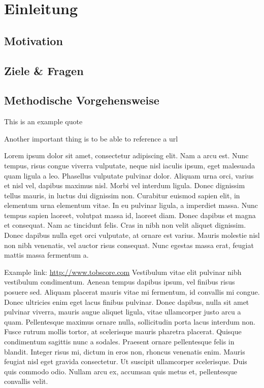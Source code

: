 \chapter{Einleitung}\label{chap:intro}
\section{Motivation}
\section{Ziele \& Fragen}
\section{Methodische Vorgehensweise}
This is an example quote \cite{TKerst12}

Another important thing is to be able to reference a url \cite{referenceURL}

Lorem ipsum dolor sit amet, consectetur adipiscing elit. Nam a arcu est. Nunc tempus, risus congue viverra vulputate, neque nisl iaculis ipsum, eget malesuada quam ligula a leo. Phasellus vulputate pulvinar dolor. Aliquam urna orci, varius et nisl vel, dapibus maximus nisl. Morbi vel interdum ligula. Donec dignissim tellus mauris, in luctus dui dignissim non. Curabitur euismod sapien elit, in elementum urna elementum vitae. In eu pulvinar ligula, a imperdiet massa. Nunc tempus sapien laoreet, volutpat massa id, laoreet diam. Donec dapibus et magna et consequat. Nam ac tincidunt felis. Cras in nibh non velit aliquet dignissim. Donec dapibus nulla eget orci vulputate, at ornare est varius. Mauris molestie nisl non nibh venenatis, vel auctor risus consequat. Nunc egestas massa erat, feugiat mattis massa fermentum a.

Example link: \url{http://www.tobscore.com}
Vestibulum vitae elit pulvinar nibh vestibulum condimentum. Aenean tempus dapibus ipsum, vel finibus risus posuere sed. Aliquam placerat mauris vitae mi fermentum, id convallis mi congue. Donec ultricies enim eget lacus finibus pulvinar. Donec dapibus, nulla sit amet pulvinar viverra, mauris augue aliquet ligula, vitae ullamcorper justo arcu a quam. Pellentesque maximus ornare nulla, sollicitudin porta lacus interdum non. Fusce rutrum mollis tortor, at scelerisque mauris pharetra placerat. Quisque condimentum sagittis nunc a sodales. Praesent ornare pellentesque felis in blandit. Integer risus mi, dictum in eros non, rhoncus venenatis enim. Mauris feugiat nisl eget gravida consectetur. Ut suscipit ullamcorper scelerisque. Duis quis commodo odio. Nullam arcu ex, accumsan quis metus et, pellentesque convallis velit.

